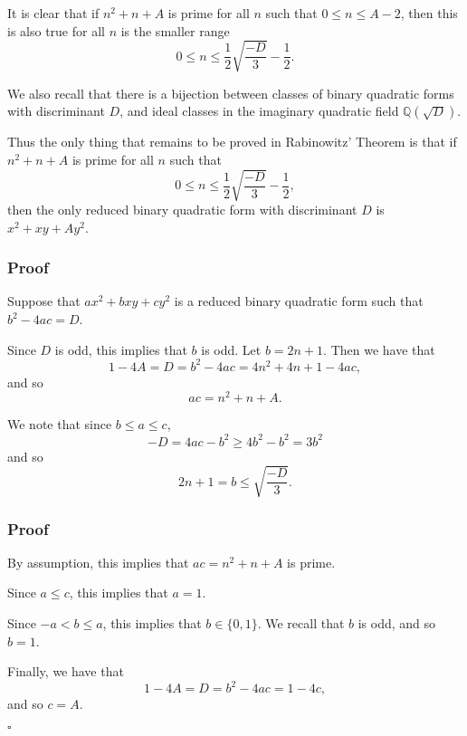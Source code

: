 \documentclass{beamer}
\begin{document}
\begin{frame}

	It is clear that if $n^2 + n + A$ is prime for all $n$ such that $0 \leq n \leq A - 2$, then this is also true for all $n$ is the smaller range
	\[
		0 \leq n \leq \frac{1}{2} \sqrt{\frac{-D}{3}} - \frac{1}{2}.
	\] \pause

	We also recall that there is a bijection between classes of binary quadratic forms with discriminant $D$, and ideal classes in the imaginary quadratic field $\mathbb{Q}(\sqrt{D})$. \pause

	Thus the only thing that remains to be proved in Rabinowitz' Theorem is that if $n^2 + n + A$ is prime for all $n$ such that
	\[
		0 \leq n \leq \frac{1}{2} \sqrt{\frac{-D}{3}} - \frac{1}{2},
	\]
	then the only reduced binary quadratic form with discriminant $D$ is $x^2 + xy + A y^2$.

\end{frame}

\begin{frame}

	\frametitle{Proof}

	Suppose that $ax^2 + bxy + cy^2$ is a reduced binary quadratic form such that $b^2 - 4ac = D$. \pause
	
	Since $D$ is odd, this implies that $b$ is odd. Let $b = 2n + 1$. Then we have that
	\[
		1 - 4A = D = b^2 - 4ac = 4n^2 + 4n + 1 - 4ac,
	\]
	and so
	\[
		ac = n^2 + n + A.
	\] \pause

	We note that since $b \leq a \leq c$,
	\[
		-D = 4ac - b^2 \geq 4b^2 - b^2 = 3b^2
	\]
	and so
	\[
		2n + 1 = b \leq \sqrt{\frac{-D}{3}}.
	\]

\end{frame}

\begin{frame}

	\frametitle{Proof}

	By assumption, this implies that $ac = n^2 + n + A$ is prime. \pause

	Since $a \leq c$, this implies that $a = 1$. \pause

	Since $-a < b \leq a$, this implies that $b \in \{0, 1\}$. We recall that $b$ is odd, and so $b = 1$. \pause

	Finally, we have that 
	\[
		1 - 4A = D = b^2 - 4ac = 1 - 4c,
	\]
	and so $c = A$.

	\hfill $\square$

\end{frame}
\end{document}
